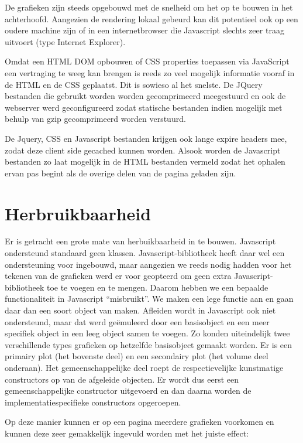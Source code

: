 De grafieken zijn steeds opgebouwd met de snelheid om het op te bouwen in het achterhoofd. Aangezien de rendering lokaal gebeurd kan dit potentieel ook op een oudere machine zijn of in een internetbrowser die Javascript slechts zeer traag uitvoert (type Internet Explorer).

Omdat een HTML DOM opbouwen of CSS properties toepassen via JavaScript een vertraging te weeg kan brengen is reeds zo veel mogelijk informatie vooraf in de HTML en de CSS geplaatst. Dit is sowieso al het snelste. De JQuery bestanden die gebruikt worden worden gecomprimeerd meegestuurd en ook de webserver werd geconfigureerd zodat statische bestanden indien mogelijk met behulp van gzip gecomprimeerd worden verstuurd.

De Jquery, CSS en Javascript bestanden krijgen ook lange expire headers mee, zodat deze client side gecached kunnen worden.
Alsook worden de Javascript bestanden zo laat mogelijk in de HTML bestanden vermeld zodat het ophalen ervan pas begint als de overige delen van de pagina  geladen zijn.

\section{Herbruikbaarheid}

Er is getracht een grote mate van herbuikbaarheid in te bouwen. Javascript ondersteund standaard geen klassen. Javascript-bibliotheek  heeft daar wel een ondersteuning voor ingebouwd, maar aangezien we reeds  nodig hadden voor het tekenen van de grafieken werd er voor geopteerd om geen extra Javascript-bibliotheek toe te voegen en te mengen. Daarom hebben we een bepaalde functionaliteit in Javascript ``misbruikt''. We maken een lege functie aan en gaan daar dan een soort object van maken.
Afleiden wordt in Javascript ook niet ondersteund, maar dat werd ge\"emuleerd door een basisobject en een meer specifiek object in een leeg object samen te voegen. Zo konden uiteindelijk twee verschillende types grafieken op hetzelfde basisobject gemaakt worden. Er is een primairy plot (het bovenste deel) en een secondairy plot (het volume deel onderaan). Het gemeenschappelijke deel roept de respectievelijke kunstmatige constructors op van de afgeleide objecten. Er wordt dus eerst een gemeenschappelijke constructor uitgevoerd en dan daarna worden de implementatiespecifieke constructors opgeroepen. 

Op deze manier kunnen er op een pagina meerdere grafieken voorkomen en kunnen deze zeer gemakkelijk ingevuld worden met het juiste effect:

